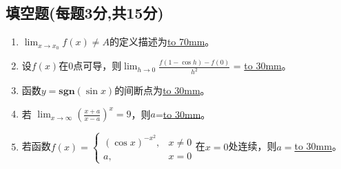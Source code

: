 \documentclass[a4paper,12pt]{article}
\begin{document}
    \begin{spacing}{2.0}
    \section{填空题(每题3分,共15分)}
    \begin{enumerate}[(1)]
        \item $\displaystyle \lim_{x \to x_0}f(x) \ne A$的定义描述为\underline{\hbox to 70mm{}}。
        \item 设$f(x)$在0点可导，则$\displaystyle \lim_{h\rightarrow 0}\frac{f(1-\cos h)-f(0)}{h^2}$
            = \underline{\hbox to 30mm{}}。
        \item 函数$y=\textbf{sgn}(\sin x)$的间断点为\underline{\hbox to 30mm{}}。
        \item 若 $\displaystyle \lim_{x\rightarrow \infty} \left(\frac{x+a}{x-a}\right)^x=9$，则$a$=\underline{\hbox to 30mm{}}。
    \item 若函数$\displaystyle f(x) = \left\{ \begin{array}{rcl} \left(\cos x\right)^{-x^2}, &x\neq 0 \\ a, & x=0 \end{array} \right.$在$x=0$处连续，则$a=$\underline{\hbox to 30mm{}}。
    \end{enumerate}
    

\end{spacing}
\end{document}
